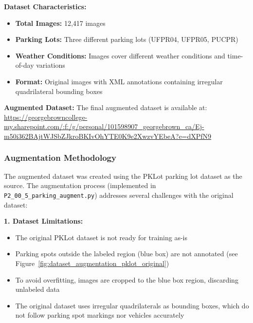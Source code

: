 \documentclass[12pt,a4paper]{article}
\begin{document}
\textbf{Dataset Characteristics:}
\begin{itemize}
    \item \textbf{Total Images:} 12,417 images
    \item \textbf{Parking Lots:} Three different parking lots (UFPR04, UFPR05, PUCPR)
    \item \textbf{Weather Conditions:} Images cover different weather conditions and time-of-day variations
    \item \textbf{Format:} Original images with XML annotations containing irregular quadrilateral bounding boxes
\end{itemize}

\textbf{Augmented Dataset:}
The final augmented dataset is available at: \url{https://georgebrowncollege-my.sharepoint.com/:f:/g/personal/101598907_georgebrown_ca/Ej-m50i362BAjtWJSbZJkroBKIvOhYTE0K9e2XwzvYEbeA?e=dXPfN9}

\subsubsection{Augmentation Methodology}

The augmented dataset was created using the PKLot parking lot dataset as the source. The augmentation process (implemented in \texttt{P2\_00\_5\_parking\_augment.py}) addresses several challenges with the original dataset:

\textbf{1. Dataset Limitations:}
\begin{itemize}
    \item The original PKLot dataset is not ready for training as-is
    \item Parking spots outside the labeled region (blue box) are not annotated (see Figure~\ref{fig:dataset_augmentation_pklot_original})
    \item To avoid overfitting, images are cropped to the blue box region, discarding unlabeled data
    \item The original dataset uses irregular quadrilaterals as bounding boxes, which do not follow parking spot markings nor vehicles accurately
\end{itemize}
\end{document}
